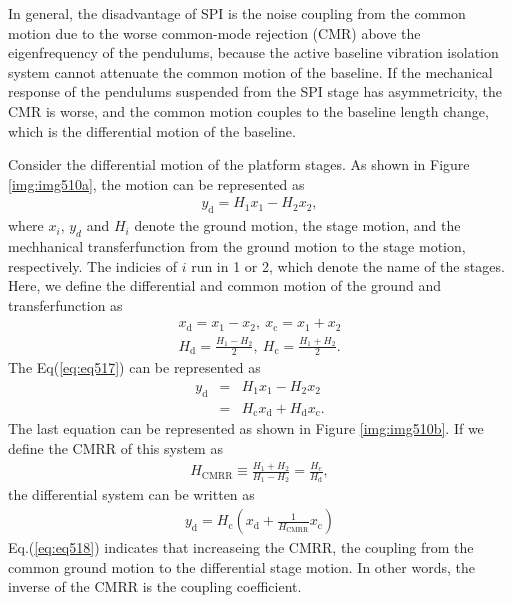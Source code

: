 In general, the disadvantage of SPI is the noise coupling from the common motion due to the worse common-mode rejection (CMR) above the eigenfrequency of the pendulums, because the active baseline vibration isolation system cannot attenuate the common motion of the baseline. If the mechanical response of the pendulums suspended from the SPI stage has asymmetricity, the CMR is worse, and the common motion couples to the baseline length change, which is the differential motion of the baseline.

Consider the differential motion of the platform stages. As shown in Figure \ref{img:img510a}, the motion can be represented as 
\begin{eqnarray}
  y_{\mathrm{d}} = H_1x_1-H_2x_2 \label{eq:eq517},
\end{eqnarray}
where $x_{i},\,y_{d}$ and $H_{i}$ denote the ground motion, the stage motion, and the mechhanical transferfunction from the ground motion to the stage motion, respectively. The indicies of $i$ run in 1 or 2, which denote the name of the stages. Here, we define the differential and common motion of the ground and transferfunction as 
\begin{eqnarray} \label{eq:eq517_b}
  x_{\mathrm{d}} = {x_1-x_2},\ x_{\mathrm{c}} = {x_1+x_2}  \\
  H_{\mathrm{d}} = \frac{H_1-H_2}{2},\ H_{\mathrm{c}} = \frac{H_1+H_2}{2} \label{eq:eq517_a}.
\end{eqnarray}
The Eq(\ref{eq:eq517}) can be represented as 
\begin{eqnarray}
  y_{\mathrm{d}} &=& H_1x_1-H_2x_2 \\
  &=& H_{\mathrm{c}}x_{\mathrm{d}} + H_{\mathrm{d}}x_{\mathrm{c}}\label{eq:eq516}.
\end{eqnarray}
The last equation can be represented as shown in Figure \ref{img:img510b}. If we define the CMRR of this system as
\begin{eqnarray}
  H_{\mathrm{CMRR}} \equiv \frac{H_1+H_2}{H_1-H_2}=\frac{H_{\mathrm{c}}}{H_{\mathrm{d}}} \label{eq:eq519},
\end{eqnarray}
the differential system can be written as 
\begin{eqnarray}
  y_{\mathrm{d}} = H_{\mathrm{c}}\left( x_{\mathrm{d}} + \frac{1}{H_{\mathrm{CMRR}}}x_{\mathrm{c}}\right) \label{eq:eq518}
\end{eqnarray}
Eq.(\ref{eq:eq518}) indicates that increaseing the CMRR, the coupling from the common ground motion to the differential stage motion. In other words, the inverse of the CMRR is the coupling coefficient.

